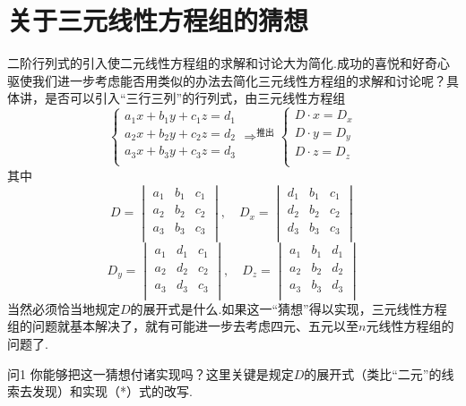 \section{关于三元线性方程组的猜想}
二阶行列式的引入使二元线性方程组的求解和讨论大为简化.成功的喜悦和好奇心驱使我们进一步考虑能否用类似的办法去简化三元线性方程组的求解和讨论呢？具体讲，是否可以引入“三行三列”的行列式，由三元线性方程组
\begin{equation}
  \begin{cases}
    a_1x+b_1y+c_1z=d_1\\
    a_2x+b_2y+c_2z=d_2\\
    a_3x+b_3y+c_3z=d_3\\
  \end{cases}\mathop{\Longrightarrow}^{\text{推出}}\begin{cases}
    D\cdot x =D_x\\
    D\cdot y =D_y\\
    D\cdot z =D_z\\
  \end{cases}\tag{*}
\end{equation}
其中
\[D=\begin{vmatrix}
  a_1&b_1&c_1\\
  a_2&b_2&c_2\\
  a_3&b_3&c_3\\
\end{vmatrix},\quad D_x=\begin{vmatrix}
  d_1&b_1&c_1\\
  d_2&b_2&c_2\\
  d_3&b_3&c_3\\
\end{vmatrix}\]
\[D_y=\begin{vmatrix}
  a_1&d_1&c_1\\
  a_2&d_2&c_2\\
  a_3&d_3&c_3\\
\end{vmatrix},\quad D_z=\begin{vmatrix}
  a_1&b_1&d_1\\
  a_2&b_2&d_2\\
  a_3&b_3&d_3\\
\end{vmatrix}\]
当然必须恰当地规定$D$的展开式是什么.如果这一“猜想”得以实现，三元线性方程组的问题就基本解决了，就有可能进一步去考虑四元、五元以至$n$元线性方程组的问题了.

\begin{thm}
  {问1} 你能够把这一猜想付诸实现吗？这里关键是规定$D$的展开式（类比“二元”的线索去发现）和实现（*）式的改写.
\end{thm}

